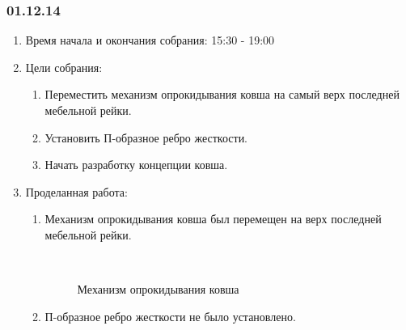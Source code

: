 \subsubsection{01.12.14}

\begin{enumerate}
	\item Время начала и окончания собрания:
	15:30 - 19:00
	\item Цели собрания:
	\begin{enumerate}
	  \item Переместить механизм опрокидывания ковша на самый верх последней мебельной рейки.
	  
	  \item Установить П-образное ребро жесткости.
	  
	  \item Начать разработку концепции ковша.
	  
    \end{enumerate}
	\item Проделанная работа:
	\begin{enumerate}
	  \item Механизм опрокидывания ковша был перемещен на верх последней мебельной рейки.
	  
	  \begin{figure}[H]
	  	\begin{minipage}[h]{0.2\linewidth}
	  		\center  
	  	\end{minipage}
	  	\begin{minipage}[h]{0.6\linewidth}
	  		\caption{Механизм опрокидывания ковша}
	  	\end{minipage}
	  \end{figure}
	  
	  \item П-образное ребро жесткости не было установлено.
	  

\end{enumerate}
\end{enumerate}
